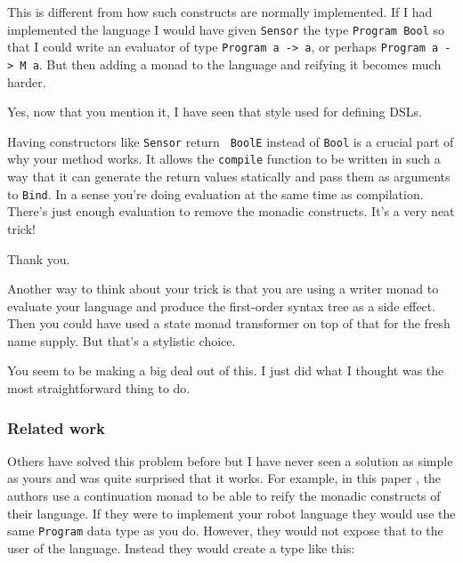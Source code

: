 \begin{dialogue}
\speak{\docname{}} This is different from how such constructs are
normally implemented. If I had implemented the language I would have
given {\tt Sensor} the type {\tt Program Bool} so that I could write
an evaluator of type {\tt Program a -> a}, or perhaps {\tt Program a -> M a}.
But then adding a monad to the language and reifying it becomes much harder.

\speak{\studname{}} Yes, now that you mention it, I have seen that style used
for defining DSLs.

\speak{\docname{}} Having constructors like {\tt Sensor} return {\tt
  BoolE} instead of {\tt Bool} is a crucial part of why your
method works. It allows the {\tt compile} function to be written in
such a way that it can generate the return values statically and pass
them as arguments to {\tt Bind}. In a sense you're doing evaluation at
the same time as compilation. There's just enough evaluation to
remove the monadic constructs. It's a very neat trick!

\speak{\studname{}} Thank you.

\speak{\docname{}} Another way to think about your trick is that you are
using a writer monad to evaluate your language and produce the first-order
syntax tree as a side effect. Then you could have used a state monad
transformer on top of that for the fresh name supply. But that's a stylistic
choice.

\speak{\studname{}} You seem to be making a big deal out of this. I
just did what I thought was the most straightforward thing to do.

\end{dialogue}

\subsubsection{Related work} 

\begin{dialogue}

\speak{\docname{}} Others have solved this problem before but I have
never seen a solution as simple as yours and was quite surprised that
it works. For example, in this paper , the authors use a
continuation monad to be able to reify the monadic constructs of their
language. If they were to implement your robot language they would use
the same \texttt{Program} data type as you do. However, they would not
expose that to the user of the language. Instead they would create a
type like this:

\end{dialogue}

